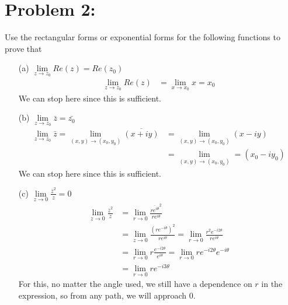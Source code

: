 \documentclass{article}
\begin{document}
\section*{Problem 2: }
Use the rectangular forms or exponential forms for the following functions to prove that
\begin{enumerate}
\item[(a)]  $\lim\limits_{z\to z_0} Re(z) = Re(z_0)$
  \begin{align*}
    \lim\limits_{z\to z_0} Re(z) &= \lim\limits_{x\to x_0} x = x_0
  \end{align*}
  We can stop here since this is sufficient.
  
\item[(b)] $\lim\limits_{z\to z_0} \bar{z} = \bar{z_0} $
  \begin{align*}
    \lim\limits_{z\to z_0} \bar{z} = \lim\limits_{(x,y)\to (x_0,y_0)} \overline{(x+iy)} &= \lim\limits_{(x,y)\to (x_0,y_0)}(x-iy) \\
    &=\lim\limits_{(x,y)\to (x_0,y_0)} = (x_0-iy_0)
  \end{align*}
  We can stop here since this is sufficient.
\item[(c)] $\lim\limits_{z\to 0} \frac{\bar{z}^2}{z} = 0$
  \begin{align*}
    \lim\limits_{z\to 0} \frac{\bar{z}^2}{z} &= \lim\limits_{r\to 0} \frac{\overline{re^{i\theta}}^2}{re^{i\theta}}\\
                                             &= \lim\limits_{z\to 0} \frac{(re^{-i\theta})^2}{re^{i\theta}} = \lim\limits_{r\to 0}\frac{r^2e^{-i2\theta}}{re^{i\theta}}\\
                                             &= \lim\limits_{r\to 0}r\frac{e^{-i2\theta}}{e^{i\theta}} = \lim\limits_{r\to 0}re^{-i2\theta}e^{-i\theta} \\
    &= \lim\limits_{r\to 0}re^{-i3\theta}
  \end{align*}
  For this, no matter the angle used, we still have a dependence on $r$ in the expression, so from any path, we will approach $0$.
\end{enumerate}

\end{document}
